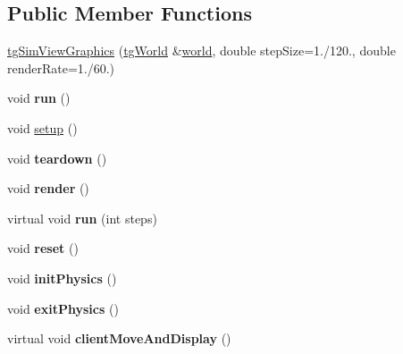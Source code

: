 \subsection*{Public Member Functions}
\begin{DoxyCompactItemize}
\item 
\hyperlink{classtg_sim_view_graphics_aafb23490336341d08679b10a7a239a2b}{tg\-Sim\-View\-Graphics} (\hyperlink{classtg_world}{tg\-World} \&\hyperlink{classtg_sim_view_a349682d852193ee75f416ab07c2d4a62}{world}, double step\-Size=1./120., double render\-Rate=1./60.)
\item 
\hypertarget{classtg_sim_view_graphics_a48e73da47cbc14d86cbd02393fd03dd9}{void {\bfseries run} ()}\label{classtg_sim_view_graphics_a48e73da47cbc14d86cbd02393fd03dd9}

\item 
void \hyperlink{classtg_sim_view_graphics_a564f833afe40bf7763bcf682098b043e}{setup} ()
\item 
\hypertarget{classtg_sim_view_graphics_a3b861e0704ad1d7c4c406860ae95a253}{void {\bfseries teardown} ()}\label{classtg_sim_view_graphics_a3b861e0704ad1d7c4c406860ae95a253}

\item 
\hypertarget{classtg_sim_view_graphics_a30348d26a7858b1ca43dcbeec69d0d7b}{void {\bfseries render} ()}\label{classtg_sim_view_graphics_a30348d26a7858b1ca43dcbeec69d0d7b}

\item 
\hypertarget{classtg_sim_view_graphics_a0923fd3ccfe0321cf8e458f4bdd64389}{virtual void {\bfseries run} (int steps)}\label{classtg_sim_view_graphics_a0923fd3ccfe0321cf8e458f4bdd64389}

\item 
\hypertarget{classtg_sim_view_graphics_a596810ae3f358eaa4cb86d75edc88b9b}{void {\bfseries reset} ()}\label{classtg_sim_view_graphics_a596810ae3f358eaa4cb86d75edc88b9b}

\item 
\hypertarget{classtg_sim_view_graphics_a3911235482d0538b4f44f7f92a69a832}{void {\bfseries init\-Physics} ()}\label{classtg_sim_view_graphics_a3911235482d0538b4f44f7f92a69a832}

\item 
\hypertarget{classtg_sim_view_graphics_ab8e9151f2bac53959f73ae84d029e591}{void {\bfseries exit\-Physics} ()}\label{classtg_sim_view_graphics_ab8e9151f2bac53959f73ae84d029e591}

\item 
\hypertarget{classtg_sim_view_graphics_ad5d58615c75c4a70d9beeb0e5ca96548}{virtual void {\bfseries client\-Move\-And\-Display} ()}\label{classtg_sim_view_graphics_ad5d58615c75c4a70d9beeb0e5ca96548}


\end{DoxyCompactItemize}

